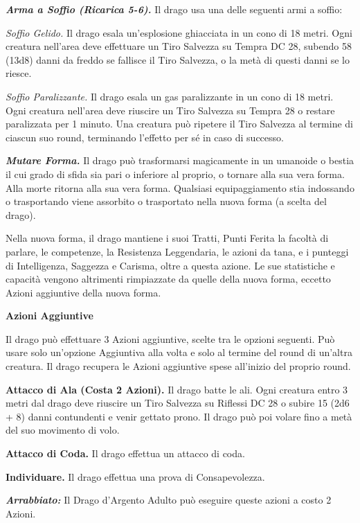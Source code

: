\begin{multicols}{2}
{\emph{\textbf{Arma a Soffio (Ricarica 5-6).}} Il drago usa una delle seguenti armi a soffio:

\emph{Soffio Gelido.} Il drago esala un'esplosione ghiacciata in un cono di 18 metri. Ogni creatura nell'area deve effettuare un Tiro Salvezza su Tempra DC 28, subendo 58 (13d8) danni da freddo se fallisce il Tiro Salvezza, o la metà di questi danni se lo riesce.

\emph{Soffio Paralizzante.} Il drago esala un gas paralizzante in un cono di 18 metri. Ogni creatura nell'area deve riuscire un Tiro Salvezza su Tempra 28 o restare paralizzata per 1 minuto. Una creatura può ripetere il Tiro Salvezza al termine di ciascun suo round, terminando l'effetto per sé in caso di successo.

\emph{\textbf{Mutare Forma.}} Il drago può trasformarsi magicamente in un umanoide o bestia il cui grado di sfida sia pari o inferiore al proprio, o tornare alla sua vera forma. Alla morte ritorna alla sua vera forma. Qualsiasi equipaggiamento stia indossando o trasportando viene assorbito o trasportato nella nuova forma (a scelta del drago).

Nella nuova forma, il drago mantiene i suoi Tratti, Punti Ferita la facoltà di parlare, le competenze, la Resistenza Leggendaria, le azioni da tana, e i punteggi di Intelligenza, Saggezza e Carisma, oltre a questa azione. Le sue statistiche e capacità vengono altrimenti rimpiazzate da quelle della nuova forma, eccetto Azioni aggiuntive della nuova forma.

\textbf{Azioni Aggiuntive}

Il drago può effettuare 3 Azioni aggiuntive, scelte tra le opzioni seguenti. Può usare solo un'opzione Aggiuntiva alla volta e solo al termine del round di un'altra creatura. Il drago recupera le Azioni aggiuntive spese all'inizio del proprio round.

\textbf{Attacco di Ala (Costa 2 Azioni).} Il drago batte le ali. Ogni creatura entro 3 metri dal drago deve riuscire un Tiro Salvezza su Riflessi DC 28 o subire 15 (2d6 + 8) danni contundenti e venir gettato prono. Il drago può poi volare fino a metà del suo movimento di volo.

\textbf{Attacco di Coda.} Il drago effettua un attacco di coda.

\textbf{Individuare.} Il drago effettua una prova di Consapevolezza.

\emph{\textbf{Arrabbiato:}} Il Drago d'Argento Adulto può eseguire queste azioni a costo 2 Azioni.

}
\end{multicols}
